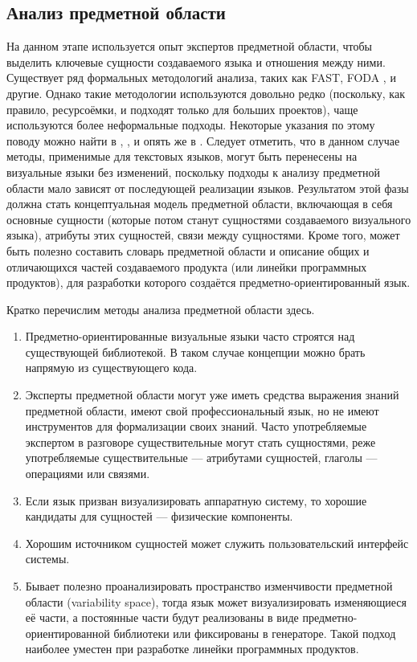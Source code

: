 \subsection{Анализ предметной области}
\label{chapterDomainAnalysis}
На данном этапе используется опыт экспертов предметной области, чтобы выделить ключевые 
сущности создаваемого языка и отношения между ними. Существует ряд формальных методологий 
анализа, таких как FAST, FODA
, и другие. Однако такие методологии используются довольно 
редко (поскольку, как правило, ресурсоёмки, и подходят только для больших проектов), 
чаще используются более неформальные подходы. Некоторые указания по этому поводу можно 
найти в \cite{mernik2005and}, \cite{voelter2009best}, \cite{luoma2004defining} и опять 
же в \cite{kelly2008domain}. Следует отметить, что в данном случае методы, применимые 
для текстовых языков, могут быть перенесены на визуальные языки без изменений, поскольку 
подходы к анализу предметной области мало зависят от последующей реализации языков. 
Результатом этой фазы должна стать концептуальная модель предметной области, включающая 
в себя основные сущности (которые потом станут сущностями создаваемого визуального языка), 
атрибуты этих сущностей, связи между сущностями. Кроме того, может быть полезно составить 
словарь предметной области и описание общих и отличающихся частей создаваемого продукта 
(или линейки программных продуктов), для разработки которого создаётся предметно-ориентированный 
язык.

Кратко перечислим методы анализа предметной области здесь.
\begin{enumerate}
	\item Предметно-ориентированные визуальные языки часто строятся над существующей 
		библиотекой. В таком случае концепции можно брать напрямую из существующего кода.
	\item Эксперты предметной области могут уже иметь средства выражения знаний предметной 
		области, имеют свой профессиональный язык, но не имеют инструментов для формализации 
		своих знаний. Часто употребляемые экспертом в разговоре существительные могут 
		стать сущностями, реже употребляемые существительные --- атрибутами сущностей, 
		глаголы --- операциями или связями. 
	\item Если язык призван визуализировать аппаратную систему, то хорошие кандидаты 
		для сущностей --- физические компоненты.
	\item Хорошим источником сущностей может служить пользовательский интерфейс системы.
	\item Бывает полезно проанализировать пространство изменчивости предметной области 
		(variability space), тогда язык может визуализировать изменяющиеся её части, а 
		постоянные части будут реализованы в виде предметно-ориентированной библиотеки
		или фиксированы в генераторе. Такой подход наиболее уместен при разработке линейки 
		программных продуктов.
\end{enumerate}


